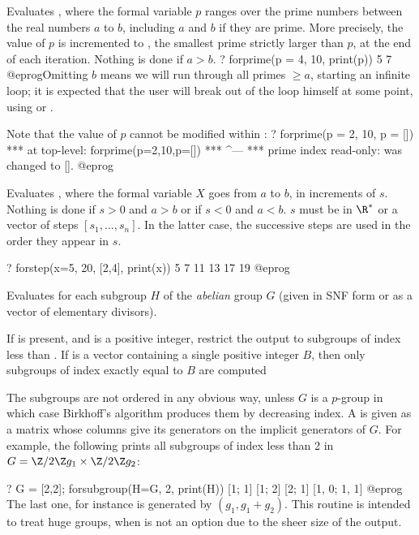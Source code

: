 \label{se:forprime}
Evaluates ,
where the formal variable $p$ ranges over the prime numbers between the real
numbers $a$ to $b$, including $a$ and $b$ if they are prime. More precisely,
the value of
$p$ is incremented to , the smallest prime strictly
larger than $p$, at the end of each iteration. Nothing is done if $a>b$.
\bprog
? forprime(p = 4, 10, print(p))
5
7
@eprog\noindent Omitting $b$ means we will run through all primes $\geq a$,
starting an infinite loop; it is expected that the user will break out of
the loop himself at some point, using  or .

Note that the value of $p$ cannot be modified within :
\bprog
? forprime(p = 2, 10, p = [])
 ***   at top-level: forprime(p=2,10,p=[])
 ***                                   ^---
 ***   prime index read-only: was changed to [].
@eprog

\label{se:forstep}
Evaluates ,
where the formal variable $X$ goes from $a$ to $b$, in increments of $s$.
Nothing is done if $s>0$ and $a>b$ or if $s<0$ and $a<b$. $s$ must be in
$\R^*$ or a vector of steps $[s_1,\dots,s_n]$. In the latter case, the
successive steps are used in the order they appear in $s$.

\bprog
? forstep(x=5, 20, [2,4], print(x))
5
7
11
13
17
19
@eprog

\label{se:forsubgroup}
Evaluates  for
each subgroup $H$ of the \emph{abelian} group $G$ (given in
SNF form or as a vector of elementary divisors).

If  is present, and is a positive integer, restrict the output to
subgroups of index less than . If  is a vector
containing a single positive integer $B$, then only subgroups of index
exactly equal to $B$ are computed

The subgroups are not ordered in any
obvious way, unless $G$ is a $p$-group in which case Birkhoff's algorithm
produces them by decreasing index. A  is given as a matrix
whose columns give its generators on the implicit generators of $G$. For
example, the following prints all subgroups of index less than 2 in $G =
\Z/2\Z g_1 \times \Z/2\Z g_2$:

\bprog
? G = [2,2]; forsubgroup(H=G, 2, print(H))
[1; 1]
[1; 2]
[2; 1]
[1, 0; 1, 1]
@eprog\noindent
The last one, for instance is generated by $(g_1, g_1 + g_2)$. This
routine is intended to treat huge groups, when  is not an
option due to the sheer size of the output.

